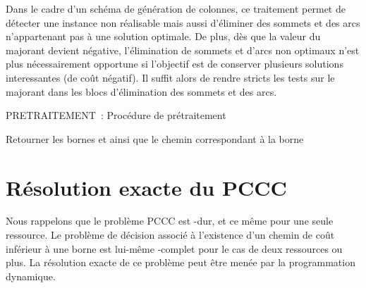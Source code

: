 \documentclass[10pt,francais]{llncs}
\begin{document}
Dans le cadre d'un sch\'ema de g\'en\'eration de colonnes, ce traitement permet de d\'etecter une instance non r\'ealisable mais aussi d'\'eliminer des sommets et des arcs n'appartenant pas \`a une solution optimale. De plus, d\`es que la valeur du majorant devient n\'egative, l'\'elimination de sommets et d'arcs non optimaux n'est plus n\'ecessairement opportune si l'objectif est de conserver plusieurs solutions interessantes (de co\^ut n\'egatif). Il suffit alors de rendre stricts les tests sur le majorant dans les blocs d'\'elimination des sommets et des arcs. 

\begin{algorithm}\label{algo-pretraitement}
\caption{PRETRAITEMENT~: Proc\'edure de pr\'etraitement}
\BlankLine
{}
\BlankLine
\;
\;
Retourner les bornes  et  ainsi que le chemin correspondant \`a la borne \;

\end{algorithm}


\section{R\'esolution exacte du PCCC}\label{sec-resol} Nous rappelons que le probl\`eme PCCC est -dur, et ce m\^eme pour une seule ressource. Le probl\`eme de d\'ecision associ\'e \`a l'existence d'un chemin de co\^ut inf\'erieur \`a une borne est lui-m\^eme -complet pour le cas de deux ressources ou plus. La r\'esolution exacte de ce probl\`eme peut \^etre men\'ee par la programmation dynamique.
\end{document}

